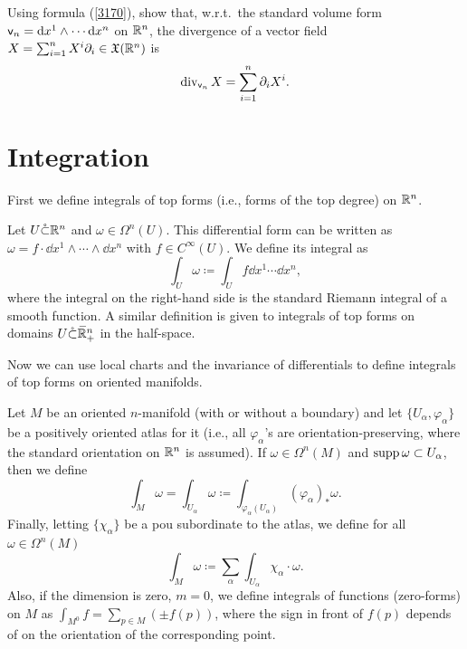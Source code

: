 \begin{xca}
    Using formula (\ref{3170}), show that, w.r.t.\ the standard volume form $\mathsf{v}_n={\mathrm{d}} x^1\wedge \cdots{\mathrm{d}} x^n$ on $\mathbb{R}^n$, the divergence of a vector field $X=\sum_{i=1}^n X^i\partial_i\in\mathfrak{X}(\mathbb{R}^n)$ is 
    \[\operatorname{div}_{\mathsf{v}_n} X=\sum_{i=1}^n \partial_i X^i.\]
\end{xca}









\section{Integration}

First we define integrals of top forms (i.e., forms of the top degree) on $\mathbb{R}^n$.
\begin{defn}
    Let $U\mathring\subset \mathbb{R}^n$ and $\omega\in \Omega^n(U)$. This differential form can be written as $\omega=f\cdot \dd x^1\wedge\cdots\wedge\dd x^n $ with $f\in C^\infty(U)$. We define its integral as
    \[\int_U\omega \coloneqq \int_U f \dd x^1\cdots\dd x^n,\]
    where the integral on the right-hand side is the standard Riemann integral of a smooth function. A similar definition is given to integrals of top forms on domains $U\mathring\subset \wb\bbR^n_+$ in the half-space.
\end{defn}

Now we can use local charts and the invariance of differentials to define integrals of top forms on oriented manifolds.

\begin{defn}
    Let $M$ be an oriented $n$-manifold (with or without a boundary) and let $\{U_\alpha,\varphi_\alpha\}$ be a positively oriented atlas for it (i.e., all $\varphi_\alpha$'s are orientation-preserving, where the standard orientation on $\mathbb{R}^n$ is assumed). If $\omega\in\Omega^n(M)$ and $\operatorname{supp}\omega\subset U_\alpha$, then we define
    \[\int_M \omega= \int_{U_\alpha}\omega \coloneqq \int_{\varphi_\alpha( U_\alpha)}(\varphi_\alpha)_\ast \omega.\]
    Finally, letting $\{\chi_\alpha\}$ be a \gls{pou} subordinate to the atlas, we define for all $\omega\in\Omega^n(M)$
    \[\int_M \omega\coloneqq \sum_\alpha \int_{U_\alpha}\chi_\alpha\cdot\omega.\]
    Also, if the dimension is zero, $m=0$, we define integrals of functions (zero-forms) on $M$ as $\int_{M^0}f=\sum_{p\in M}(\pm f(p))$, where the sign in front of $f(p)$ depends of on the orientation of the corresponding point.
\end{defn}


